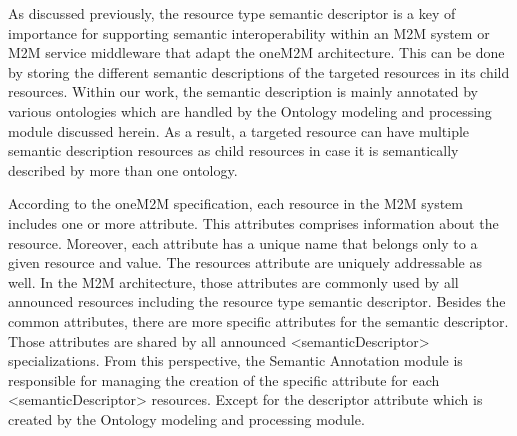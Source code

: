 As discussed previously, the resource type semantic descriptor is a key of importance for supporting semantic interoperability within an M2M system or M2M service middleware that adapt the oneM2M architecture. This can be done by storing the different semantic descriptions of the targeted resources in its child resources.
Within our work, the semantic description is mainly annotated by various ontologies which are handled by the Ontology modeling and processing module discussed herein. As a result, a targeted resource can have multiple semantic description resources as child resources in case it is semantically described by more than one ontology.\par
According to the oneM2M specification, each resource in the M2M system includes one or more attribute. This attributes comprises information about the resource. Moreover, each attribute has a unique name that belongs only to a given resource and value. The resources attribute are uniquely addressable as well.
In the M2M architecture, those attributes are commonly used by all announced resources including the resource type semantic descriptor. Besides the common attributes, there are more specific attributes for the semantic descriptor. Those attributes are shared by all announced <semanticDescriptor> specializations. From this perspective, the Semantic Annotation module is responsible for managing the creation of the specific attribute for each <semanticDescriptor> resources. Except for the descriptor attribute which is created by the Ontology modeling and processing module. \par

